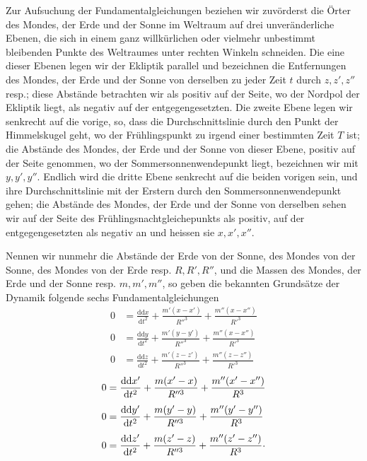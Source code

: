 \par\noindent\hspace*{\parindent}Zur Aufsuchung der Fundamentalgleichungen beziehen wir zuvörderst die
Örter des Mondes, der Erde und der Sonne im Weltraum auf drei unveränderliche
Ebenen, die sich in einem ganz willkürlichen oder vielmehr unbestimmt
bleibenden Punkte des Weltraumes unter rechten Winkeln schneiden. Die eine
dieser Ebenen legen wir der Ekliptik parallel und bezeichnen die Entfernungen
des Mondes, der Erde und der Sonne von derselben zu jeder Zeit \(t\) durch
\(z,z',z''\) resp.; diese Abstände betrachten wir als positiv auf der Seite, wo
der Nordpol der Ekliptik liegt, als negativ auf der entgegengesetzten. Die
zweite Ebene legen wir senkrecht auf die vorige, so, dass die
Durchschnittslinie durch den Punkt der Himmelskugel geht, wo der Frühlingspunkt
zu irgend einer bestimmten Zeit \(T\) ist; die Abstände des Mondes, der Erde und
der Sonne von dieser Ebene, positiv auf der Seite genommen, wo der
Sommersonnenwendepunkt liegt, bezeichnen wir mit \(y,y',y''\). Endlich wird die
dritte Ebene senkrecht auf die beiden vorigen sein, und ihre Durchschnittslinie
mit der Erstern durch den Sommersonnenwendepunkt gehen; die Abstände des
Mondes, der Erde und der Sonne von derselben sehen wir auf der Seite des
Frühlingsnachtgleichepunkts als positiv, auf der entgegengesetzten als negativ
an und heissen sie \(x,x',x''\).

\par\noindent\hspace*{\parindent}Nennen wir nunmehr die Abstände der Erde von der Sonne, des Mondes von der
Sonne, des Mondes von der Erde resp. \(R,R',R''\), und die Massen des Mondes, der
Erde und der Sonne resp. \(m,m',m''\), so geben die bekannten Grundsätze der
Dynamik folgende sechs Fundamentalgleichungen
\[
\begin{aligned}
0&=\frac{\mathrm{dd}x}{\mathrm{d}t^2}
  +\frac{m'(x-x')}{R''^3}+\frac{m''(x-x'')}{R'^3}\\[4pt]
0&=\frac{\mathrm{dd}y}{\mathrm{d}t^2}
  +\frac{m'(y-y')}{R''^3}+\frac{m''(x-x'')}{R'^3}\\[4pt]
0&=\frac{\mathrm{dd}z}{\mathrm{d}t^2}
  +\frac{m'(z-z')}{R''^3}+\frac{m''(z-z'')}{R'^3}
\end{aligned}
\]
\[
\begin{aligned}
0&=\frac{\mathrm{dd}x'}{\mathrm{d}t^2}
  +\frac{m(x'-x)}{R''^3}+\frac{m''(x'-x'')}{R^3}\\[4pt]
0&=\frac{\mathrm{dd}y'}{\mathrm{d}t^2}
  +\frac{m(y'-y)}{R''^3}+\frac{m''(y'-y'')}{R^3}\\[4pt]
0&=\frac{\mathrm{dd}z'}{\mathrm{d}t^2}
  +\frac{m(z'-z)}{R''^3}+\frac{m''(z'-z'')}{R^3}
  \mathpunct{\raisebox{.4ex}{.}}
\end{aligned}
\]
\clearpage
\endgroup
